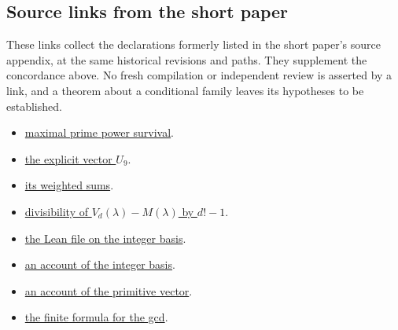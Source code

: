 \subsection{Source links from the short paper}\label{long68:sec:short-concordance}

These links collect the declarations formerly listed in the short
paper's source appendix, at the same historical revisions and paths.
They supplement the concordance above. No fresh compilation or
independent review is asserted by a link, and a theorem about a
conditional family leaves its hypotheses to be established.

\begingroup\small\raggedright
\begin{itemize}[leftmargin=*]
\item \href{https://github.com/wcook04/plectis-erdos/blob/f36a98bf3d3e6f65f1074e3b800e3293d5b8a51a/ErdosProblems/Erdos68/PaperCompletePrimePole.lean#L118}{maximal prime power survival}.
\item \href{https://github.com/wcook04/plectis-erdos/blob/f36a98bf3d3e6f65f1074e3b800e3293d5b8a51a/ErdosProblems/Erdos68/PaperCompleteSupplementary.lean#L17}{the explicit vector $U_9$}.
\item \href{https://github.com/wcook04/plectis-erdos/blob/f36a98bf3d3e6f65f1074e3b800e3293d5b8a51a/ErdosProblems/Erdos68/PaperCompleteSupplementary.lean#L45}{its weighted sums}.
\item \href{https://github.com/wcook04/plectis-erdos/blob/f36a98bf3d3e6f65f1074e3b800e3293d5b8a51a/ErdosProblems/Erdos68/PaperCompleteSupplementary.lean#L53}{divisibility of $V_d(\lambda)-M(\lambda)$ by $d!-1$}.
\item \href{https://github.com/wcook04/plectis-erdos/blob/f36a98bf3d3e6f65f1074e3b800e3293d5b8a51a/ErdosProblems/Erdos68/DivisorChannelBasis.lean}{the Lean file on the integer basis}.
\item \href{https://github.com/wcook04/plectis-erdos/blob/f36a98bf3d3e6f65f1074e3b800e3293d5b8a51a/ErdosProblems/Erdos68/DivisorChannelBasis.md}{an account of the integer basis}.
\item \href{https://github.com/wcook04/plectis-erdos/blob/f36a98bf3d3e6f65f1074e3b800e3293d5b8a51a/ErdosProblems/Erdos68/CompressedPrimitiveChannelKernel.md}{an account of the primitive vector}.
\item \href{https://github.com/wcook04/plectis-erdos/blob/f36a98bf3d3e6f65f1074e3b800e3293d5b8a51a/ErdosProblems/Erdos68/PaperCompleteMomentHorizon.lean}{the finite formula for the gcd}.

\end{itemize}

